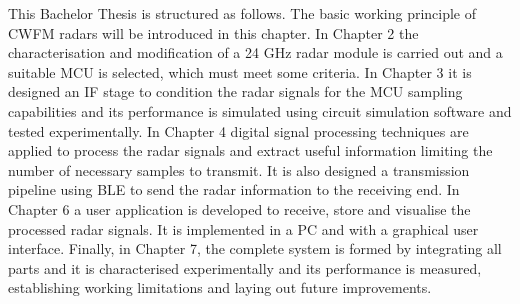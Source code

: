 	This Bachelor Thesis is structured as follows. The basic working principle of CWFM radars will be introduced in this chapter. In Chapter 2 the characterisation and modification of a 24 GHz radar module is carried out and a suitable MCU is selected, which must meet some criteria. In Chapter 3 it is designed an IF stage to condition the radar signals for the MCU sampling capabilities and its performance is simulated using circuit simulation software and tested experimentally. In Chapter 4 digital signal processing techniques are applied to process the radar signals and extract useful information limiting the number of necessary samples to transmit. It is also designed a transmission pipeline using BLE to send the radar information to the receiving end. In Chapter 6 a user application is developed to receive, store and visualise the processed radar signals. It is implemented in a PC and with a graphical user interface. Finally, in Chapter 7, the complete system is formed by integrating all parts and it is characterised experimentally and its performance is measured, establishing working limitations and laying out future improvements.